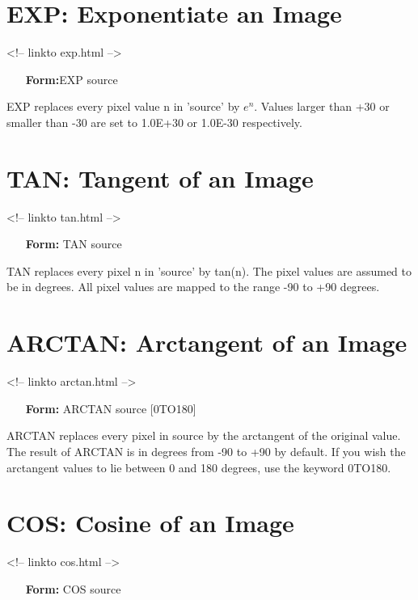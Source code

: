 \section{EXP: Exponentiate an Image}
\begin{rawhtml}
<!-- linkto exp.html -->
\end{rawhtml}
\begin{itemize}
  \item[\textbf{Form:}EXP source\hfill]{}
\end{itemize}

EXP replaces every pixel value n in 'source' by $e^n$.  Values larger than
+30 or smaller than -30 are set to 1.0E+30 or 1.0E-30 respectively.

\section{TAN: Tangent of an Image}
\begin{rawhtml}
<!-- linkto tan.html -->
\end{rawhtml}
\begin{itemize}
  \item[\textbf{Form:}  TAN source\hfill]{}
\end{itemize}

TAN replaces every pixel n in 'source' by tan(n).  The pixel values are
assumed to be in degrees.  All pixel values are mapped to the range -90 to
+90 degrees.

\section{ARCTAN: Arctangent of an Image}
\begin{rawhtml}
<!-- linkto arctan.html -->
\end{rawhtml}
\begin{itemize}
  \item[\textbf{Form:} ARCTAN source {[0TO180]}\hfill]{}
\end{itemize}

ARCTAN replaces every pixel in source by the arctangent of the original
value.  The result of ARCTAN is in degrees from -90 to +90 by default.  If
you wish the arctangent values to lie between 0 and 180 degrees, use the
keyword 0TO180.

\section{COS: Cosine of an Image}
\begin{rawhtml}
<!-- linkto cos.html -->
\end{rawhtml}
\begin{itemize}
  \item[\textbf{Form:} COS source\hfill]{}
\end{itemize}

